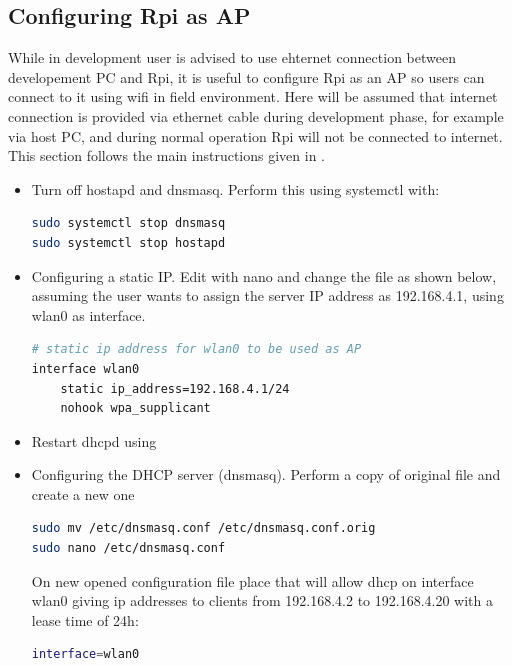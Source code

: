 \subsection{Configuring Rpi as AP}
While in development user is advised to use ehternet connection between developement PC and \gls{Rpi}, it is useful to configure \gls{Rpi} as an \gls{AP} so users can connect to it using wifi in field environment. Here will be assumed that internet connection is provided via ethernet cable during development phase, for example via host PC, and during normal operation \gls{Rpi} will not be connected to internet. This section follows the main instructions given in \cite{raspberry_AP}.
\begin{itemize}
	\tightlist
	\item Turn off hostapd and dnsmasq. Perform this using systemctl with:
	\begin{lstlisting}[frame=none,language=bash,backgroundcolor=\color{gray!15},numbers=none,		basicstyle=\ttfamily]
sudo systemctl stop dnsmasq
sudo systemctl stop hostapd
\end{lstlisting}
	\item Configuring a static IP. Edit  with nano and change the file as shown below, assuming the user wants to assign the server IP address as 192.168.4.1, using wlan0 as interface.
	\begin{lstlisting}[frame=none,language=bash,backgroundcolor=\color{gray!15},numbers=none,		basicstyle=\ttfamily]
# static ip address for wlan0 to be used as AP
interface wlan0
    static ip_address=192.168.4.1/24
    nohook wpa_supplicant
\end{lstlisting}
   	\item Restart dhcpd using 
   	\item Configuring the DHCP server (dnsmasq). Perform a copy of original file and create a new one
\begin{lstlisting}[frame=none,language=bash,backgroundcolor=\color{gray!15},numbers=none,		basicstyle=\ttfamily]
sudo mv /etc/dnsmasq.conf /etc/dnsmasq.conf.orig  
sudo nano /etc/dnsmasq.conf
\end{lstlisting}
   	On new opened configuration file place that will allow dhcp on interface wlan0 giving ip addresses to clients from 192.168.4.2 to 192.168.4.20 with a lease time of 24h:
   	\begin{lstlisting}[frame=none,language=bash,backgroundcolor=\color{gray!15},numbers=none,		basicstyle=\ttfamily]
interface=wlan0

\end{lstlisting}
\end{itemize}
